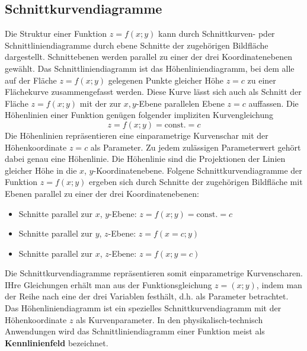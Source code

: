 \subsection{Schnittkurvendiagramme}
Die Struktur einer Funktion $z=f\left(x; y\right)$ kann durch Schnittkurven- pder Schnittliniendiagramme durch ebene Schnitte der zugehörigen Bildfläche dargestellt. Schnittebenen werden parallel zu einer der drei Koordinatenebenen gewählt. Das Schnittliniendiagramm ist das Höhenliniendiagramm, bei dem alle auf der Fläche $z=f\left(x; y\right)$ gelegenen Punkte gleicher Höhe $z=c$ zu einer Flächekurve zusammengefasst werden.
\newline \newline
Diese Kurve lässt sich auch als Schnitt der Fläche $z=f\left(x; y\right)$ mit der zur $x,y$-Ebene parallelen Ebene $z=c$ auffassen. Die Höhenlinien einer Funktion genügen folgender impliziten Kurvengleichung
\begin{equation}
\boxed{z=f\left(x; y\right)=\text{const.}=c}
\end{equation}
Die Höhenlinien repräsentieren eine einparametrige Kurvenschar mit der Höhenkoordinate $z=c$ als Parameter. Zu jedem zulässigen Parameterwert gehört dabei genau eine Höhenlinie. Die Höhenlinie sind die Projektionen der Linien gleicher Höhe in die $x$, $y$-Koordinatenebene. 
\newline\newline
Folgene Schnittkurvendiagramme der Funktion $z=f\left(x; y\right)$ ergeben sich durch Schnitte der zugehörigen Bildfläche mit Ebenen parallel zu einer der drei Koordinatenebenen:
\begin{itemize}
\item Schnitte parallel zur $x$, $y$-Ebene: $z=f\left(x; y\right)=\text{const.}=c$
\item Schnitte parallel zur $y$, $z$-Ebene: $z=f\left(x=c; y\right)$
\item Schnitte parallel zur $x$, $z$-Ebene: $z=f\left(x; y=c\right)$
\end{itemize}
Die Schnittkurvendiagramme repräsentieren somit einparametrige Kurvenscharen. IHre Gleichungen erhält man aus der Funktionsgleichung $z=\left(x; y\right)$, indem man der Reihe nach eine der drei Variablen festhält, d.h. als Parameter betrachtet. Das Höhenliniendiagramm ist ein spezielles Schnittkurvendiagramm mit der Höhenkoordinate $z$ als Kurvenparameter. In den physikalisch-technisch Anwendungen wird das Schnittliniendiagramm einer Funktion meist als \textbf{Kennlinienfeld} bezeichnet.
